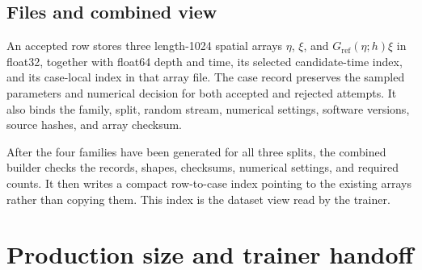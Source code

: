 \documentclass[10pt]{article}
\newcommand{\Gref}{G_{\mathrm{ref}}}
\begin{document}
\subsection{Files and combined view}

An accepted row stores three length-1024 spatial arrays
$\eta$, $\xi$, and $\Gref(\eta;h)\xi$ in float32, together with float64 depth
and time, its selected candidate-time index, and its case-local index in that
array file.
The case record preserves the sampled parameters and numerical decision for
both accepted and rejected attempts.  It also binds the family, split,
random stream, numerical settings, software versions, source hashes, and
array checksum.

After the four families have been generated for all three splits, the
combined builder checks the records, shapes, checksums, numerical settings,
and required counts.  It then writes a compact row-to-case index pointing to
the existing arrays rather than copying them.  This index is the dataset
view read by the trainer.

\section{Production size and trainer handoff}
\label{sec:handoff}
\end{document}
